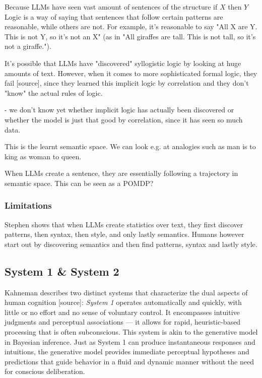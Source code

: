 Because LLMs have seen vast amount of sentences of the structure if $X$ then $Y$
Logic is a way of saying that sentences that follow certain patterns are reasonable, while others are not. For example, it's reasonable to say "All X are Y. This is not Y, so it's not an X" (as in "All giraffes are tall. This is not tall, so it's not a giraffe.").

It's possible that LLMs have "discovered" syllogistic logic by looking at huge amounts of text. However, when it comes to more sophisticated formal logic, they fail [source], since they learned this implicit logic by correlation and they don't "know" the actual rules of logic.

- we don't know yet whether implicit logic has actually been discovered or whether the model is just that good by correlation, since it has seen so much data.


This is the learnt semantic space. We can look e.g. at analogies such as man is to king as woman to queen.

When LLMs create a sentence, they are essentially following a trajectory in semantic space. This can be seen as a POMDP?


\subsubsection{Limitations}
Stephen shows that when LLMs create statistics over text, they first discover patterns, then syntax, then style, and only lastly semantics. Humans however start out by discovering semantics and then find patterns, syntax and lastly style. 














\subsection{System 1 \& System 2}

Kahneman describes two distinct systems that characterize the dual aspects of human cognition [source]:
\emph{System 1} operates automatically and quickly, with little or no effort and no sense of voluntary control. It encompasses intuitive judgments and perceptual associations — it allows for rapid, heuristic-based processing that is often subconscious.
This system is akin to the generative model in Bayesian inference. Just as System 1 can produce instantaneous responses and intuitions, the generative model provides immediate perceptual hypotheses and predictions that guide behavior in a fluid and dynamic manner without the need for conscious deliberation.

